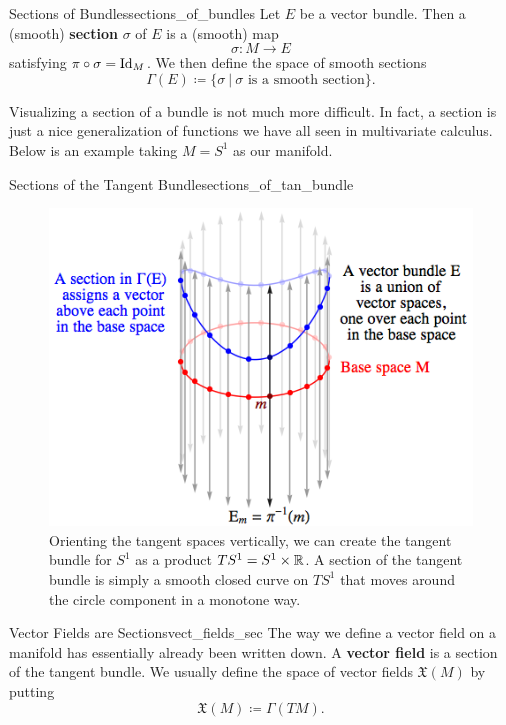 \begin{df}{Sections of Bundles}{sections_of_bundles}
Let $E$ be a vector bundle.  Then a (smooth) \textbf{section} $\sigma$ of $E$ is a (smooth) map
\[
\sigma \colon M \to E
\]
satisfying $\pi \circ \sigma = \mathrm{Id}_M$. We then define the space of smooth sections
\[
\Gamma(E)\coloneqq \{\sigma ~\vert~ \textrm{$\sigma$ is a smooth section}\}.
\]
\end{df}

Visualizing a section of a bundle is not much more difficult.  In fact, a section is just a nice generalization of functions we have all seen in multivariate calculus.  Below is an example taking $M=S^1$ as our manifold. 


\begin{fig}{Sections of the Tangent Bundle}{sections_of_tan_bundle}
\begin{figure}[H]
    \centering
    \includegraphics[width=.6\textwidth]{TACA_2019/s1_tan_bundle.png}
    \caption{Orienting the tangent spaces vertically, we can create the tangent bundle for $S^1$ as a product $TS^1=S^1\times \mathbb{R}$. A section of the tangent bundle is simply a smooth closed curve on $TS^1$ that moves around the circle component in a monotone way.}
    \label{fig:tangent_bundle_sec}
\end{figure}
\end{fig}

\begin{rmk}{Vector Fields are Sections}{vect_fields_sec}
The way we define a vector field on a manifold has essentially already been written down. A \textbf{vector field} is a section of the tangent bundle. We usually define the space of vector fields $\mathfrak{X}(M)$ by putting
\[
\mathfrak{X}(M)\coloneqq \Gamma(TM).
\]
\end{rmk}


